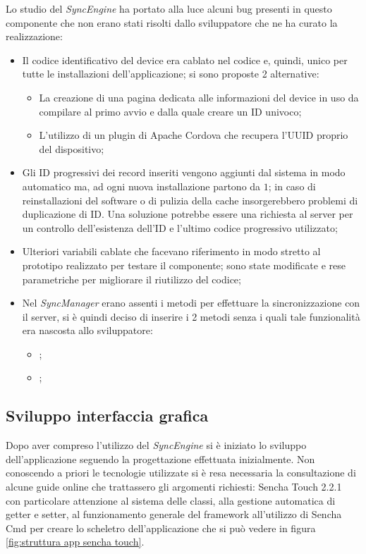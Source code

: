 Lo studio del \emph{SyncEngine} ha portato alla luce alcuni bug presenti in questo componente che non erano stati risolti dallo sviluppatore che ne ha curato la realizzazione:
\begin{itemize}
\item Il codice identificativo del device era cablato nel codice e, quindi, unico per tutte le installazioni dell'applicazione; si sono proposte 2 alternative:
	\begin{itemize}
	\item La creazione di una pagina dedicata alle informazioni del device in uso da compilare al primo avvio e dalla quale creare un ID univoco;
	\item L'utilizzo di un plugin di Apache Cordova che recupera l'\ac{UUID} proprio del dispositivo;
	\end{itemize}
\item Gli ID progressivi dei record inseriti vengono aggiunti dal sistema in modo automatico ma, ad ogni nuova installazione partono da $1$; in caso di reinstallazioni del software o di pulizia della cache insorgerebbero problemi di duplicazione di ID. Una soluzione potrebbe essere una richiesta al server per un controllo dell'esistenza dell'ID e l'ultimo codice progressivo utilizzato;
\item Ulteriori variabili cablate che facevano riferimento in modo stretto al prototipo realizzato per testare il componente; sono state modificate e rese parametriche per migliorare il riutilizzo del codice;
\item Nel \emph{SyncManager} erano assenti i metodi per effettuare la sincronizzazione con il server, si è quindi deciso di inserire i 2 metodi senza i quali tale funzionalità era nascosta allo sviluppatore:
	\begin{itemize}
	\item {};
	\item {};
	\end{itemize}
\end{itemize}



\subsection{Sviluppo interfaccia grafica}
Dopo aver compreso l'utilizzo del \emph{SyncEngine} si è iniziato lo sviluppo dell'applicazione seguendo la progettazione effettuata inizialmente.
Non conoscendo a priori le tecnologie utilizzate si è resa necessaria la consultazione di alcune guide online che trattassero gli argomenti richiesti: Sencha Touch 2.2.1~\cite{sencha:touch221} con particolare attenzione al sistema delle classi, alla gestione automatica di getter e setter, al funzionamento generale del framework all'utilizzo di Sencha Cmd per creare lo scheletro dell'applicazione che si può vedere in figura \ref{fig:struttura app sencha touch}.


